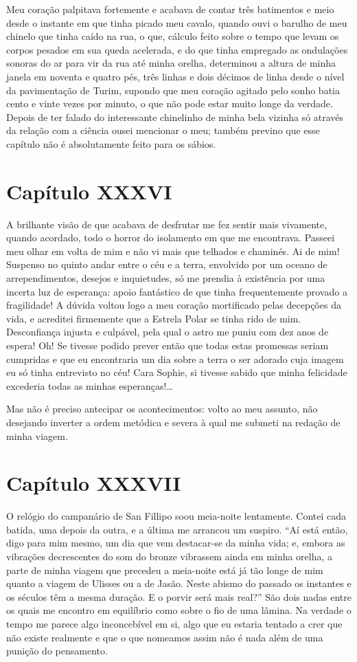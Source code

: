  Meu coração palpitava fortemente e acabava de contar três batimentos e
meio desde o instante em que tinha picado meu cavalo, quando ouvi o
barulho de meu chinelo que tinha caído na rua, o que, cálculo feito
sobre o tempo que levam os corpos pesados em sua queda acelerada, e do
que tinha empregado as ondulações sonoras do ar para vir da rua até
minha orelha, determinou a altura de minha janela em noventa e quatro
pés, três linhas e dois décimos de linha desde o nível da pavimentação
de Turim, supondo que meu coração agitado pelo sonho batia cento e
vinte vezes por minuto, o que não pode estar muito longe da verdade.
Depois de ter falado do interessante chinelinho de minha bela vizinha
só através da relação com a ciência ousei mencionar o meu; também
previno que esse capítulo não é absolutamente feito para os sábios.

\section*{Capítulo XXXVI}

 A brilhante visão de que acabava de desfrutar me fez sentir mais
vivamente, quando acordado, todo o horror do isolamento em que me
encontrava. Passeei meu olhar em volta de mim e não vi mais que
telhados e chaminés. Ai de mim! Suspenso no quinto andar entre o céu e
a terra, envolvido por um oceano de arrependimentos, desejos e
inquietudes, só me prendia à existência por uma incerta luz de
esperança: apoio fantástico de que tinha frequentemente provado a
fragilidade! A dúvida voltou logo a meu coração mortificado pelas
decepções da vida, e acreditei firmemente que a Estrela Polar se tinha
rido de mim. Desconfiança injusta e culpável, pela qual o astro me
puniu com dez anos de espera! Oh! Se tivesse podido prever então que
todas estas promessas seriam cumpridas e que eu encontraria um dia
sobre a terra o ser adorado cuja imagem eu só tinha entrevisto no céu!
Cara Sophie, si tivesse sabido que minha felicidade excederia todas as
minhas esperanças!\ldots

 Mas não é preciso antecipar os acontecimentos: volto ao meu assunto,
não desejando inverter a ordem metódica e severa à qual me submeti na
redação de minha viagem.

\section*{Capítulo XXXVII}

 O relógio do campanário de San Fillipo soou meia-noite lentamente.
Contei cada batida, uma depois da outra, e a última me arrancou um
suspiro. ``Aí está então, digo para mim mesmo, um dia que vem
destacar-se da minha vida; e, embora as vibrações decrescentes do som
do bronze vibrassem ainda em minha orelha, a parte de minha viagem que
precedeu a meia-noite está já tão longe de mim quanto a viagem de
Ulisses ou a de Jasão. Neste abismo do passado os instantes e os
séculos têm a mesma duração. E o porvir será mais real?'' São dois nadas
entre os quais me encontro em equilíbrio como sobre o fio de uma
lâmina. Na verdade o tempo me parece algo inconcebível em si, algo que
eu estaria tentado a crer que não existe realmente e que o que nomeamos
assim não é nada além de uma punição do pensamento.  

